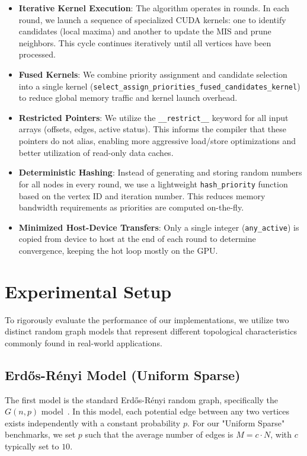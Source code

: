 \documentclass{article}
\begin{document}
\begin{itemize}
    \item \textbf{Iterative Kernel Execution}: The algorithm operates in rounds. In each round, we launch a sequence of specialized CUDA kernels: one to identify candidates (local maxima) and another to update the MIS and prune neighbors. This cycle continues iteratively until all vertices have been processed.
    \item \textbf{Fused Kernels}: We combine priority assignment and candidate selection into a single kernel (\texttt{select\_assign\_priorities\_fused\_candidates\_kernel}) to reduce global memory traffic and kernel launch overhead.
    \item \textbf{Restricted Pointers}: We utilize the \texttt{\_\_restrict\_\_} keyword for all input arrays (offsets, edges, active status). This informs the compiler that these pointers do not alias, enabling more aggressive load/store optimizations and better utilization of read-only data caches.
    \item \textbf{Deterministic Hashing}: Instead of generating and storing random numbers for all nodes in every round, we use a lightweight \texttt{hash\_priority} function based on the vertex ID and iteration number. This reduces memory bandwidth requirements as priorities are computed on-the-fly.
    \item \textbf{Minimized Host-Device Transfers}: Only a single integer (\texttt{any\_active}) is copied from device to host at the end of each round to determine convergence, keeping the hot loop mostly on the GPU.
\end{itemize}

\section{Experimental Setup}
To rigorously evaluate the performance of our implementations, we utilize two distinct random graph models that represent different topological characteristics commonly found in real-world applications.

\subsection{Erdős-Rényi Model (Uniform Sparse)}
The first model is the standard Erdős-Rényi random graph, specifically the $G(n, p)$ model~\cite{erdos1959}. In this model, each potential edge between any two vertices exists independently with a constant probability $p$. For our "Uniform Sparse" benchmarks, we set $p$ such that the average number of edges is $M = c \cdot N$, with $c$ typically set to $10$.
\end{document}
